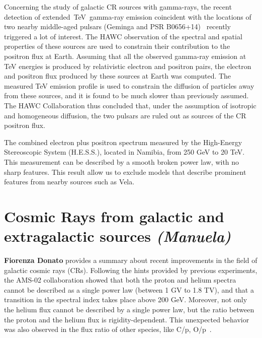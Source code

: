 \documentclass{PoS}
\begin{document}
Concerning the study of galactic CR sources with gamma-rays, the recent detection of extended~TeV~gamma-ray emission coincident with the 
locations of two nearby middle-aged pulsars (Geminga and PSR 
B0656+14)~\cite{HAWCpositrons} recently triggered a lot of interest. The HAWC observation of the spectral and spatial properties of these sources are used
to constrain their contribution to the positron flux at Earth. Assuming that all the observed gamma-ray emission at TeV energies is
produced by relativistic electron and positron pairs, the electron and positron
flux produced by these sources at Earth was computed. The measured TeV emission profile is used to constrain the diffusion of particles away from these
sources, and it is found to be much slower than previously assumed. The HAWC Collaboration thus concluded that, under the assumption of isotropic and homogeneous diffusion, the two pulsars are ruled out as sources of the CR positron flux.


The combined electron plus positron spectrum  measured by the High-Energy Stereoscopic System (H.E.S.S.), located in Namibia, from 250 GeV to 20 TeV. This measurement can be described by a smooth broken power law, with no sharp features. This result allow us to exclude models that describe prominent features from nearby sources such as Vela.

\section{Cosmic Rays from galactic and extragalactic sources {\it (Manuela)}}
{\bf Fiorenza Donato} provides a summary about recent improvements in the field of galactic cosmic rays (CRs). Following the hints provided by previous experiments, the AMS-02 collaboration  showed 
that both the proton and helium spectra~\cite{proton}~\cite{Aguilar:2015ctt}
 cannot be described as a single power law (between 1 GV to 1.8 TV), and that
a transition in the spectral index takes place above 200 GeV.  Moreover, not only the helium flux cannot be described by a single power law, but the ratio
between the proton and the helium flux is rigidity-dependent. This unexpected behavior was also observed in the flux ratio of other species,
like C/p, O/p~\cite{heco}. 
\end{document}
